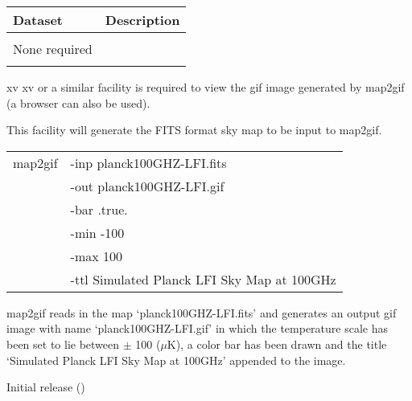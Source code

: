 \begin{datasets}
{
\begin{tabular}{p{0.3\hsize} p{0.35\hsize}} \hline  
  \textbf{Dataset} & \textbf{Description} \\ \hline
                   &                      \\ %
  None required & \\ 
                   &                      \\ \hline %
\end{tabular}
} 
\end{datasets}

\begin{support}
  \begin{sulist}{} %
  \item[xv] xv or a similar facility is required to view the
            gif image generated by map2gif (a browser can also 
            be used).
  \item[\htmlref{synfast}{fac:synfast}] This \healpix facility will generate the FITS format 
            sky map to be input to map2gif.
  \end{sulist}
\end{support}


\begin{examples}{1}
{
\begin{tabular}{ll} %
map2gif & -inp planck100GHZ-LFI.fits \\
        & -out planck100GHZ-LFI.gif \\
        & -bar .true. \\
        & -min -100 \\
        & -max 100 \\
        & -ttl Simulated Planck LFI Sky Map at 100GHz \\
\end{tabular}
}
{map2gif reads in the map `planck100GHZ-LFI.fits' and generates
an output gif image with name `planck100GHZ-LFI.gif' in which
the temperature scale has been set to lie between $\pm$ 100 ($\mu$K), 
a color bar has been drawn and the title `Simulated Planck
LFI Sky Map at 100GHz' appended to the image.
}
\end{examples}

\begin{release}
  \begin{relist}
    \item Initial release ()
  \end{relist}
\end{release}


